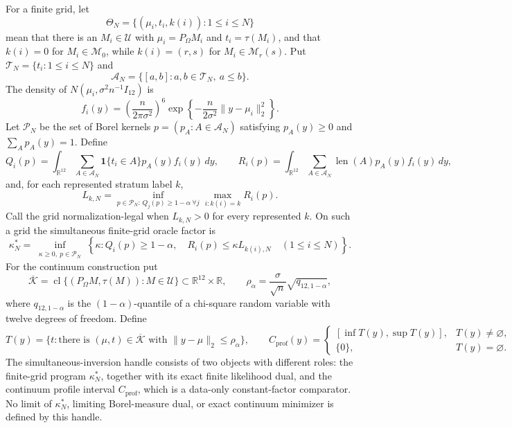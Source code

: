 For a finite grid, let
\[
 \Theta_N=\{(\mu_i,t_i,k(i)):1\leq i\leq N\}
\]
mean that there is an \(M_i\in\mathcal U\) with \(\mu_i=P_\Omega M_i\) and \(t_i=\tau(M_i)\), and that \(k(i)=0\) for \(M_i\in\mathcal M_0\), while \(k(i)=(r,s)\) for \(M_i\in\mathcal M_r(s)\).  Put \(\mathcal T_N=\{t_i:1\leq i\leq N\}\) and
\[
 \mathcal A_N=\{[a,b]:a,b\in\mathcal T_N,\ a\leq b\}.
\]
The density of \(N(\mu_i,\sigma^2n^{-1}I_{12})\) is
\[
 f_i(y)=\left(\frac{n}{2\pi\sigma^2}\right)^6
 \exp\!\left\{-\frac{n}{2\sigma^2}\lVert y-\mu_i\rVert_2^2\right\}.
\]
Let \(\mathcal P_N\) be the set of Borel kernels \(p=(p_A:A\in\mathcal A_N)\) satisfying \(p_A(y)\geq0\) and \(\sum_Ap_A(y)=1\).  Define
\[
 Q_i(p)=\int_{\mathbb R^{12}}\sum_{A\in\mathcal A_N}
 \mathbf 1\{t_i\in A\}p_A(y)f_i(y)\,dy,
 \qquad
 R_i(p)=\int_{\mathbb R^{12}}\sum_{A\in\mathcal A_N}
 \operatorname{len}(A)p_A(y)f_i(y)\,dy,
\]
and, for each represented stratum label \(k\),
\[
 L_{k,N}=\inf_{p\in\mathcal P_N:\,Q_j(p)\geq1-\alpha\ \forall j}
 \max_{i:k(i)=k}R_i(p).
\]
Call the grid normalization-legal when \(L_{k,N}>0\) for every represented \(k\).  On such a grid the simultaneous finite-grid oracle factor is
\[
 \kappa_N^*=\inf_{\substack{\kappa\geq0,\ p\in\mathcal P_N}}
 \left\{\kappa:Q_i(p)\geq1-\alpha,\quad
 R_i(p)\leq\kappa L_{k(i),N}\quad(1\leq i\leq N)\right\}.
\]
For the continuum construction put
\[
 \overline{\mathcal K}=\operatorname{cl}\{(P_\Omega M,\tau(M)):M\in\mathcal U\}
 \subset\mathbb R^{12}\times\mathbb R,
 \qquad
 \rho_\alpha=\frac{\sigma}{\sqrt n}\sqrt{q_{12,1-\alpha}},
\]
where \(q_{12,1-\alpha}\) is the \((1-\alpha)\)-quantile of a chi-square random variable with twelve degrees of freedom.  Define
\[
 T(y)=\{t:\text{there is }(\mu,t)\in\overline{\mathcal K}
 \text{ with }\lVert y-\mu\rVert_2\leq\rho_\alpha\},
 \qquad
 C_{\mathrm{prof}}(y)=
 \begin{cases}
 [\inf T(y),\sup T(y)],&T(y)\neq\varnothing,\\
 \{0\},&T(y)=\varnothing.
 \end{cases}
\]
The simultaneous-inversion handle consists of two objects with different roles: the finite-grid program \(\kappa_N^*\), together with its exact finite likelihood dual, and the continuum profile interval \(C_{\mathrm{prof}}\), which is a data-only constant-factor comparator.  No limit of \(\kappa_N^*\), limiting Borel-measure dual, or exact continuum minimizer is defined by this handle.